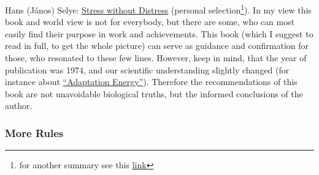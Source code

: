\documentclass{article}
\begin{document}
Hans (János) Selye: \href{https://www.goodreads.com/book/show/625310.Stress_without_Distress}{Stress without Distress} (personal selection\footnote{for another summary see this \href{https://whatijustread.blogspot.com/2021/10/stress-without-distress-by-hans-selye.html}{link}}).
In my view this book and world view is not for everybody, but there are some, who can most easily find their purpose in work and achievements. This book (which I suggest to read in full, to get the whole picture) can serve as guidance and confirmation for those, who resonated to these few lines.
However, keep in mind, that the year of publication was 1974, and our scientific understanding slightly changed (for instance about \href{https://doi.org/10.1016/j.plrev.2021.03.001}{``Adaptation Energy''}). Therefore the recommendations of this book are not unavoidable biological truths, but the informed conclusions of the author.

\subsubsection{More Rules}
\end{document}
